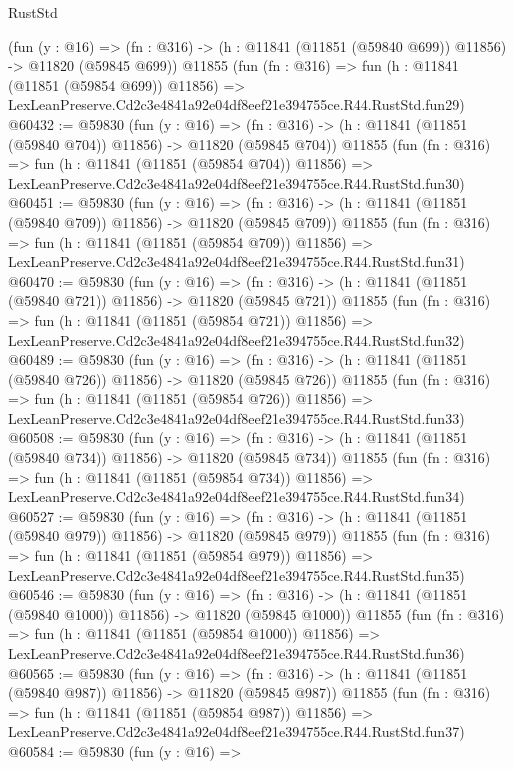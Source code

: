\begin{lexlean}{RustStd}
\begin{coremodule}
    (fun (y : @16) =>
    (fn : @316) -> (h : @11841 (@11851 (@59840 @699)) @11856) -> @11820 (@59845 @699))
    @11855
    (fun (fn : @316) =>
    fun (h : @11841 (@11851 (@59854 @699)) @11856) =>
    LexLeanPreserve.Cd2c3e4841a92e04df8eef21e394755ce.R44.RustStd.fun29)
@60432 := @59830
    (fun (y : @16) =>
    (fn : @316) -> (h : @11841 (@11851 (@59840 @704)) @11856) -> @11820 (@59845 @704))
    @11855
    (fun (fn : @316) =>
    fun (h : @11841 (@11851 (@59854 @704)) @11856) =>
    LexLeanPreserve.Cd2c3e4841a92e04df8eef21e394755ce.R44.RustStd.fun30)
@60451 := @59830
    (fun (y : @16) =>
    (fn : @316) -> (h : @11841 (@11851 (@59840 @709)) @11856) -> @11820 (@59845 @709))
    @11855
    (fun (fn : @316) =>
    fun (h : @11841 (@11851 (@59854 @709)) @11856) =>
    LexLeanPreserve.Cd2c3e4841a92e04df8eef21e394755ce.R44.RustStd.fun31)
@60470 := @59830
    (fun (y : @16) =>
    (fn : @316) -> (h : @11841 (@11851 (@59840 @721)) @11856) -> @11820 (@59845 @721))
    @11855
    (fun (fn : @316) =>
    fun (h : @11841 (@11851 (@59854 @721)) @11856) =>
    LexLeanPreserve.Cd2c3e4841a92e04df8eef21e394755ce.R44.RustStd.fun32)
@60489 := @59830
    (fun (y : @16) =>
    (fn : @316) -> (h : @11841 (@11851 (@59840 @726)) @11856) -> @11820 (@59845 @726))
    @11855
    (fun (fn : @316) =>
    fun (h : @11841 (@11851 (@59854 @726)) @11856) =>
    LexLeanPreserve.Cd2c3e4841a92e04df8eef21e394755ce.R44.RustStd.fun33)
@60508 := @59830
    (fun (y : @16) =>
    (fn : @316) -> (h : @11841 (@11851 (@59840 @734)) @11856) -> @11820 (@59845 @734))
    @11855
    (fun (fn : @316) =>
    fun (h : @11841 (@11851 (@59854 @734)) @11856) =>
    LexLeanPreserve.Cd2c3e4841a92e04df8eef21e394755ce.R44.RustStd.fun34)
@60527 := @59830
    (fun (y : @16) =>
    (fn : @316) -> (h : @11841 (@11851 (@59840 @979)) @11856) -> @11820 (@59845 @979))
    @11855
    (fun (fn : @316) =>
    fun (h : @11841 (@11851 (@59854 @979)) @11856) =>
    LexLeanPreserve.Cd2c3e4841a92e04df8eef21e394755ce.R44.RustStd.fun35)
@60546 := @59830
    (fun (y : @16) =>
    (fn : @316) -> (h : @11841 (@11851 (@59840 @1000)) @11856) -> @11820 (@59845 @1000))
    @11855
    (fun (fn : @316) =>
    fun (h : @11841 (@11851 (@59854 @1000)) @11856) =>
    LexLeanPreserve.Cd2c3e4841a92e04df8eef21e394755ce.R44.RustStd.fun36)
@60565 := @59830
    (fun (y : @16) =>
    (fn : @316) -> (h : @11841 (@11851 (@59840 @987)) @11856) -> @11820 (@59845 @987))
    @11855
    (fun (fn : @316) =>
    fun (h : @11841 (@11851 (@59854 @987)) @11856) =>
    LexLeanPreserve.Cd2c3e4841a92e04df8eef21e394755ce.R44.RustStd.fun37)
@60584 := @59830
    (fun (y : @16) =>

\end{coremodule}
\end{lexlean}
